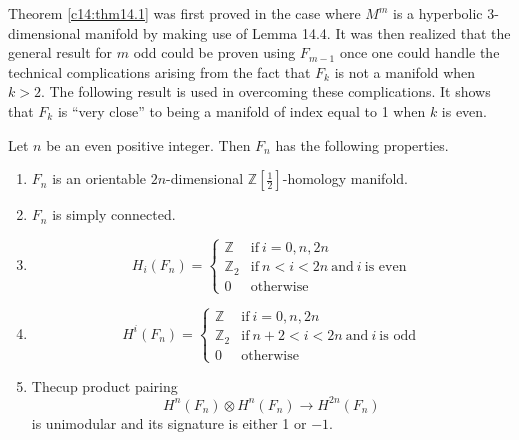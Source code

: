 \begin{remark*}
  Theorem \ref{c14:thm14.1} was first proved in the case where $M^m$
  is a hyperbolic 3-dimensional manifold by making use of Lemma
  14.4. It was then realized that the general result for $m$ odd could
  be proven using $F_{m-1}$ once one could handle the technical
  complications arising from the fact that $F_k$ is not a manifold
  when $k > 2$. The following result is used in overcoming these
  complications. It shows that $F_k$ is ``very close'' to being a
  manifold of index equal to 1 when $k$ is even.
\end{remark*}

\begin{lemma}\label{c14:lem14.5}
  Let $n$ be an even positive integer. Then $F_n$ has the following
  properties. 
  \begin{enumerate}
 \renewcommand{\labelenumi}{\rm\theenumi.}
    \item $F_n$ is an orientable $2n$-dimensional
      $\mathbb{Z}[\frac{1}{2}]$-homology manifold.
      \item $F_n$ is simply connected.
        \item 
          $$
          H_i (F_n)=
          \begin{cases}
            \mathbb{Z} & \text{if} ~i =0, n, 2n\\
            \mathbb{Z}_2 & \text{if}~ n < i < 2n~ \text{and}~ i
            ~\text{is even}\\
            0 & \text{otherwise}
          \end{cases}
          $$

        \item 
          $$
          H^i (F_n)=
          \begin{cases}
            \mathbb{Z} & \text{if} ~i =0, n, 2n\\
            \mathbb{Z}_2 & \text{if}~ n +2 < i < 2n~ \text{and}~ i
            ~\text{is odd}\\
            0 & \text{otherwise}
          \end{cases}
          $$
       \item The\pageoriginale cup product pairing
         $$
         H^n (F_n) \otimes H^n (F_n) \to H^{2n} (F_n)
         $$
         is unimodular and its signature is either 1 or $-1$.
  \end{enumerate}
\end{lemma}

